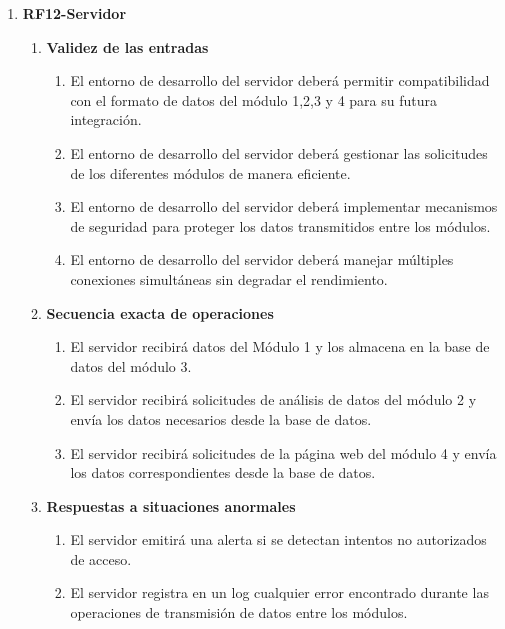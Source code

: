 \begin{enumerate}
\item \label{it:RF12} \textbf{RF12-Servidor}
    \begin{enumerate}
            \item \textbf{Validez de las entradas}
                \begin{enumerate}
                    \item El entorno de desarrollo del servidor deberá permitir compatibilidad con el formato de datos del módulo 1,2,3 y 4 para su futura integración.
                    \item El entorno de desarrollo del servidor deberá gestionar las solicitudes de los diferentes módulos de manera eficiente.
                    \item El entorno de desarrollo del servidor deberá implementar mecanismos de seguridad para proteger los datos transmitidos entre los módulos.
                    \item El entorno de desarrollo del servidor deberá manejar múltiples conexiones simultáneas sin degradar el rendimiento.
                \end{enumerate}   
            
            \item \textbf{Secuencia exacta de operaciones}
                \begin{enumerate}
                    \item El servidor recibirá datos del Módulo 1 y los almacena en la base de datos del módulo 3.
                    \item El servidor recibirá solicitudes de análisis de datos del módulo 2 y envía los datos necesarios desde la base de datos.
                    \item El servidor recibirá solicitudes de la página web del módulo 4 y envía los datos correspondientes desde la base de datos.
                \end{enumerate}   
        
            \item \textbf{Respuestas a situaciones anormales}
                \begin{enumerate}
                    \item El servidor emitirá una alerta si se detectan intentos no autorizados de acceso.
                    \item El servidor registra en un log cualquier error encontrado durante las operaciones de transmisión de datos entre los módulos.
                \end{enumerate}   
       

\end{enumerate}
\end{enumerate}
